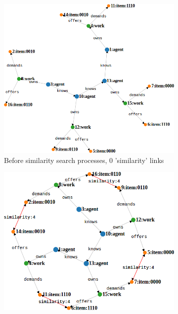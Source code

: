 \documentclass{article}
\begin{document}
\begin{figure}[H]
    \centering
    \captionsetup{justification=centering, size=scriptsize}
    \begin{subfigure}{0.45\textwidth}
        \includegraphics[width=1\textwidth]{toy_graph_before_processes.png}
      \caption{Before similarity search processes, 0 'similarity' links}
      \label{fig:small-before-processes}
    \end{subfigure}
    \begin{subfigure}{0.45\textwidth}
        \includegraphics[width=1\textwidth]{toy_graph_after_processes.png}

\end{subfigure}
\end{figure}
\end{document}
